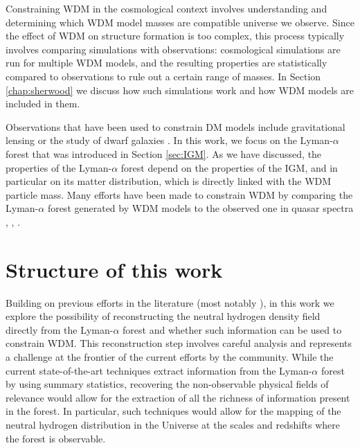 Constraining WDM in the cosmological context involves understanding and determining which WDM model masses are compatible universe we observe. Since the effect of WDM on structure formation is too complex, this process typically involves comparing simulations with observations: cosmological simulations are run for multiple WDM models, and the resulting properties are statistically compared to observations to rule out a certain range of masses. In Section \ref{chap:sherwood} we discuss how such simulations work and how WDM models are included in them.

Observations that have been used to constrain DM models include gravitational lensing \cite{Massey_2010} or the study of dwarf galaxies \cite{Calore_2018}. In this work, we focus on the Lyman-$\alpha$ forest that was introduced in Section \ref{sec:IGM}. As we have discussed, the properties of the Lyman-$\alpha$ forest depend on the properties of the IGM, and in particular on its matter distribution, which is directly linked with the WDM particle mass. Many efforts have been made to constrain WDM by comparing the Lyman-$\alpha$ forest generated by WDM models to the observed one in quasar spectra \cite{sherwood_wdm}, \cite{Villasenor_2023}, \cite{Viel_2005}.

\section{Structure of this work}
Building on previous efforts in the literature (most notably \cite{nasir2024deep}), in this work we explore the possibility of reconstructing the neutral hydrogen density field directly from the Lyman-$\alpha$ forest and whether such information can be used to constrain WDM. This reconstruction step involves careful analysis and represents a challenge at the frontier of the current efforts by the community. While the current state-of-the-art techniques extract information from the Lyman-$\alpha$ forest by using summary statistics, recovering the
non-observable physical fields of relevance would allow for the extraction of all the richness of information present in the forest. In particular, such techniques would allow for the mapping of the neutral hydrogen distribution in the Universe at the scales and redshifts where the forest is observable.

